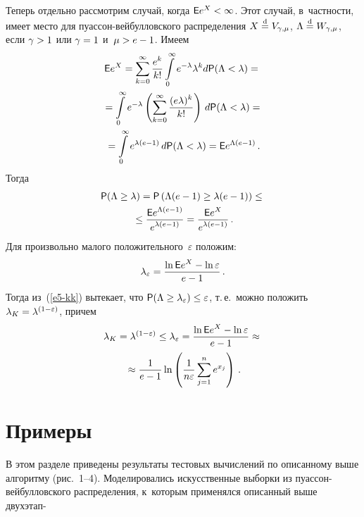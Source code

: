 \begin{multicols}{2}
Теперь отдельно рассмотрим случай, когда ${\sf E}e^X\hm<\infty$. Этот
случай, в~част\-ности, имеет место для пу\-ас\-сон-вей\-бул\-лов\-ско\-го
распределения $X\hm\eqd V_{\gamma,\mu}$, $\Lambda\hm\eqd W_{\gamma,\mu}$,
если $\gamma\hm>1$ или $\gamma\hm=1$ и~$\mu\hm>e\hm-1$. Имеем
\begin{multline*}
{\sf E}e^X=\sum\limits_{k=0}^{\infty}\displaystyle\frac{\displaystyle e^k\mathstrut}{\displaystyle k!\mathstrut}
\int\limits_{0}^{\infty}e^{-\lambda}\lambda^kd{\sf P}
(\Lambda<\lambda)={}\\
{}=\int\limits_{0}^{\infty}e^{-\lambda}
\left(\sum\limits_{k=0}^{\infty}\displaystyle\frac{\displaystyle (e\lambda)^k\mathstrut}{\displaystyle k!\mathstrut}\right)\,d{\sf P}
(\Lambda<\lambda)={}
\\
{}=
\int\limits_{0}^{\infty}e^{\lambda(e-1)}\,d{\sf P}(\Lambda<\lambda)=
{\sf E}e^{\Lambda(e-1)}\,.
\end{multline*}
Тогда
\begin{multline}
{\sf P}(\Lambda\ge\lambda)={\sf P}
\left(\Lambda(e-1)\ge\lambda(e-1)\right)\le{}\\
{}\le \displaystyle\frac{\displaystyle {\sf E}
e^{\Lambda(e-1)}\mathstrut}{\displaystyle e^{\lambda(e-1)}\mathstrut}=\displaystyle\frac{\displaystyle {\sf E} e^X\mathstrut}{\displaystyle e^{\lambda(e-1)}\mathstrut}\,.
\label{e5-kk}
\end{multline}
Для произвольно малого положительного~$\varepsilon$ положим:
$$
\lambda_{\varepsilon}=\displaystyle\frac{\displaystyle \ln{\sf E}e^X-\ln\varepsilon\mathstrut}{\displaystyle e-1\mathstrut}\,.
$$
Тогда из~(\ref{e5-kk}) вытекает, что ${\sf P}
(\Lambda\hm\ge\lambda_{\varepsilon})\hm\le\varepsilon$, т.\,е.\ можно
положить $\lambda_K\hm=\lambda^{(1-\varepsilon)}$, причем
\begin{multline*}
\lambda_K=\lambda^{(1-\varepsilon)}\le\lambda_{\varepsilon}=\displaystyle\frac{\displaystyle \ln{\sf E}
e^X-\ln\varepsilon\mathstrut}{\displaystyle e-1\mathstrut}\approx{}\\
{}\approx \displaystyle\frac{\displaystyle 1\mathstrut}{\displaystyle e-1\mathstrut}\ln\left( 
\displaystyle\frac{\displaystyle 1\mathstrut}{\displaystyle n\varepsilon\mathstrut}\sum\limits_{j=1}^ne^{x_j}\right)\,.
\end{multline*}

\vspace*{-9pt}

\section{Примеры}

\vspace*{-2pt}

В этом разделе приведены результаты тестовых вычислений по
описанному выше алгоритму (рис.~1--4). Моделировались искусственные выборки из
пу\-ас\-сон-вей\-бул\-лов\-ско\-го распределения, к~которым применялся описанный
выше двухэтап-\linebreak\vspace*{-10pt}


\end{multicols}
